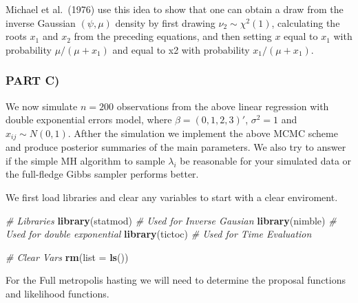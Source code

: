 \documentclass[
]{article}
\newenvironment{Shaded}{\begin{snugshade}}{\end{snugshade}}
\newcommand{\CommentTok}[1]{\textcolor[rgb]{0.56,0.35,0.01}{\textit{#1}}}
\newcommand{\DataTypeTok}[1]{\textcolor[rgb]{0.13,0.29,0.53}{#1}}
\newcommand{\KeywordTok}[1]{\textcolor[rgb]{0.13,0.29,0.53}{\textbf{#1}}}
\newcommand{\NormalTok}[1]{#1}
\begin{document}
Michael et al.~(1976) use this idea to show that one can obtain a draw
from the inverse Gaussian \((\psi, \mu)\) density by first drawing
\(\nu_2 \sim \chi^2(1)\), calculating the roots \(x_1\) and \(x_2\) from
the preceding equations, and then setting \(x\) equal to \(x_1\) with
probability \(\mu/(\mu + x_1)\) and equal to x2 with probability
\(x_1/(\mu + x_1)\).

\hypertarget{part-c}{%
\subsubsection{PART C)}\label{part-c}}

We now simulate \(n = 200\) observations from the above linear
regression with double exponential errors model, where
\(\beta = (0, 1, 2, 3)'\), \(\sigma^2 = 1\) and \(x_{ij} \sim N(0, 1)\).
Afther the simulation we implement the above MCMC scheme and produce
posterior summaries of the main parameters. We also try to answer if the
simple MH algorithm to sample \(\lambda_i\) be reasonable for your
simulated data or the full-fledge Gibbs sampler performs better.

We first load libraries and clear any variables to start with a clear
enviroment.

\begin{Shaded}
\begin{Highlighting}[]
\CommentTok{# Libraries}
\KeywordTok{library}\NormalTok{(statmod) }\CommentTok{# Used for Inverse Gausian}
\KeywordTok{library}\NormalTok{(nimble)  }\CommentTok{# Used for double exponential}
\KeywordTok{library}\NormalTok{(tictoc)  }\CommentTok{# Used for Time Evaluation}

\CommentTok{# Clear Vars}
\KeywordTok{rm}\NormalTok{(}\DataTypeTok{list =} \KeywordTok{ls}\NormalTok{())}
\end{Highlighting}
\end{Shaded}

For the Full metropolis hasting we will need to determine the proposal
functions and likelihood functions.
\end{document}
